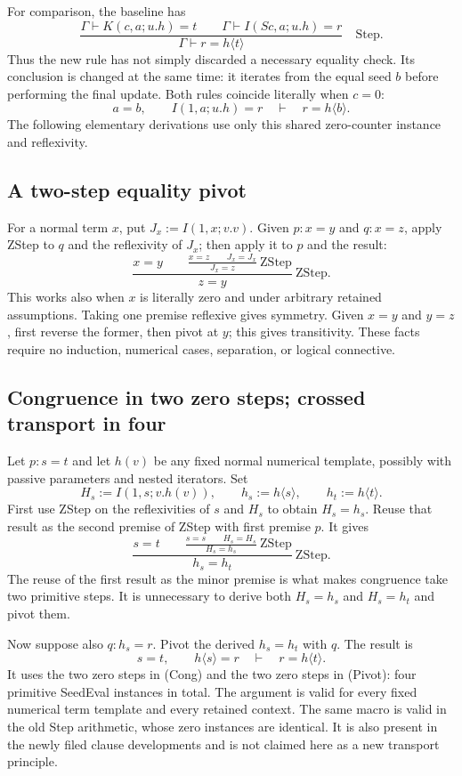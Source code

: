 \documentclass[11pt,letterpaper]{article}
\begin{document}
For comparison, the baseline has
\[
 \frac{\Gamma\vdash K(c,a;u.h)=t\qquad
       \Gamma\vdash I(Sc,a;u.h)=r}
      {\Gamma\vdash r=h\langle t\rangle}
       \quad\mathrm{Step}.\tag{Step}
\]
Thus the new rule has not simply discarded a necessary equality
check.  Its conclusion is changed at the same time: it iterates from
the equal seed $b$ before performing the final update.  Both rules
coincide literally when $c=0$:
\[
 a=b,\qquad I(1,a;u.h)=r
       \quad\vdash\quad r=h\langle b\rangle.
 \tag{ZStep}
\]
The following elementary derivations use only this shared zero-counter
instance and reflexivity.

\subsection{A two-step equality pivot}

For a normal term $x$, put $J_x:=I(1,x;v.v)$.  Given
$p:x=y$ and $q:x=z$, apply ZStep to $q$ and the reflexivity of $J_x$;
then apply it to $p$ and the result:
\[
 \frac{x=y\qquad
       \displaystyle\frac{x=z\qquad J_x=J_x}{J_x=z}\ \mathrm{ZStep}}
      {z=y}\ \mathrm{ZStep}.
 \tag{Pivot}
\]
This works also when $x$ is literally zero and under arbitrary retained
assumptions.  Taking one premise reflexive gives symmetry.  Given
$x=y$ and $y=z$, first reverse the former, then pivot at $y$;
this gives transitivity.  These facts require no induction, numerical
cases, separation, or logical connective.

\subsection{Congruence in two zero steps; crossed transport in four}

Let $p:s=t$ and let $h(v)$ be any fixed normal numerical template,
possibly with passive parameters and nested iterators.  Set
\[
        H_s:=I(1,s;v.h(v)),\qquad
        h_s:=h\langle s\rangle,\qquad h_t:=h\langle t\rangle.
\]
First use ZStep on the reflexivities of $s$ and $H_s$ to obtain
$H_s=h_s$.  Reuse that result as the second premise of ZStep with
first premise $p$.  It gives
\[
 \frac{s=t\qquad
       \displaystyle\frac{s=s\qquad H_s=H_s}{H_s=h_s}\ \mathrm{ZStep}}
      {h_s=h_t}\ \mathrm{ZStep}.
 \tag{Cong}
\]
The reuse of the first result as the minor premise is what makes
congruence take two primitive steps.  It is unnecessary to derive
both $H_s=h_s$ and $H_s=h_t$ and pivot them.

Now suppose also $q:h_s=r$.  Pivot the derived $h_s=h_t$ with $q$.
The result is
\[
       s=t,\qquad h\langle s\rangle=r
           \quad\vdash\quad r=h\langle t\rangle.
 \tag{Tr}
\]
It uses the two zero steps in (Cong) and the two zero steps in (Pivot):
four primitive SeedEval instances in total.  The argument is valid for
every fixed numerical term template and every retained context.
The same macro is valid in the old Step arithmetic, whose zero instances
are identical. It is also present in the newly filed clause developments
and is not claimed here as a new transport principle.
\end{document}
